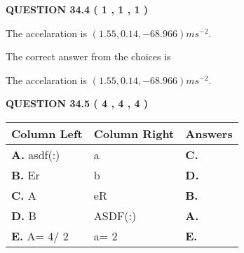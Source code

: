 \documentclass[12pt]{article}
\begin{document}
 
 
 
  
\vspace{0.2in}
  
{\textbf{\Large{QUESTION
34.4 
 (           1 ,           1 ,           1 )
}}}
  
  


 
 
\noindent{}
 
 
The accelaration is $  %
(
1.55,
0.14,
-68.966)
ms^{-2} $.
 
 
 
 
 
 
\noindent{}

The correct answer from the choices is


The accelaration is $  %
(
1.55,
0.14,
-68.966)
ms^{-2} $.
 
 
 
  
\vspace{0.2in}
  
{\textbf{\Large{QUESTION
34.5 
 (           4 ,           4 ,           4 )
}}}
  
  
 
 
\noindent{}
  
  
\begin{tabular}{|l|l|l|}
 \hline
 Column Left & Column Right  & Answers       \\ 
 \hline
{\textbf{\large{
A.}}}
asdf(:)
  & 
a
 & 
{\textbf{\large{
C.}}}
 \\ 
 \hline
{\textbf{\large{
B.}}}
Er
  & 
b
 & 
{\textbf{\large{
D.}}}
 \\ 
 \hline
{\textbf{\large{
C.}}}
A
  & 
eR
 & 
{\textbf{\large{
B.}}}
 \\ 
 \hline
{\textbf{\large{
D.}}}
B
  & 
ASDF(:)
 & 
{\textbf{\large{
A.}}}
 \\ 
 \hline
{\textbf{\large{
E.}}}
 A= %
4/ %
2

  & 
 a= %
2
 & 
{\textbf{\large{
E.}}}
 \\ 
 \hline
 \end{tabular}
  
  
 
 
 
 
  
\vspace{0.2in}
  
\end{document}

